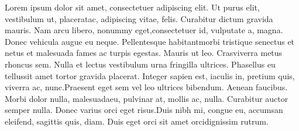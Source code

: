 \fixindent Lorem ipsum dolor sit amet, consectetuer adipiscing elit. Ut purus elit, vestibulum ut, placeratac, adipiscing vitae, felis. Curabitur dictum gravida mauris. Nam arcu libero, nonummy eget,consectetuer id, vulputate a, magna. Donec vehicula augue eu neque. Pellentesque habitantmorbi tristique senectus et netus et malesuada fames ac turpis egestas. Mauris ut leo. Crasviverra metus rhoncus sem. Nulla et lectus vestibulum urna fringilla ultrices. Phasellus eu tellussit amet tortor gravida placerat. Integer sapien est, iaculis in, pretium quis, viverra ac, nunc.Praesent eget sem vel leo ultrices bibendum. Aenean faucibus. Morbi dolor nulla, malesuadaeu, pulvinar at, mollis ac, nulla. Curabitur auctor semper nulla. Donec varius orci eget risus.Duis nibh mi, congue eu, accumsan eleifend, sagittis quis, diam. Duis eget orci sit amet orcidignissim rutrum.

